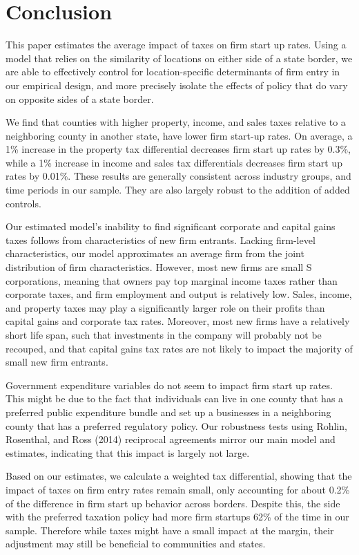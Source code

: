 \documentclass[12pt,a4paper]{article}
\begin{document}
\section{Conclusion}

This paper estimates the average impact of taxes on firm start up rates. Using a model that relies on the similarity of locations on either side of a state border, we are able to effectively control for location-specific determinants of firm entry in our empirical design, and more precisely isolate the effects of policy  that do vary on opposite sides of a state border. 

We find that counties with higher property, income, and sales taxes relative to a neighboring county in another state, have lower firm start-up rates. On average, a 1\% increase in the property tax differential decreases firm start up rates by 0.3\%, while a 1\% increase in income and sales tax differentials decreases firm start up rates by 0.01\%.   These results are generally consistent across industry groups, and time periods in our sample.  They are also largely robust to the addition of added controls.

Our estimated model's inability to find significant corporate and capital gains taxes follows from characteristics of new firm entrants. Lacking firm-level characteristics, our model approximates an average firm from the joint distribution of firm characteristics. However, most new firms are small S corporations, meaning that owners pay top marginal income taxes rather than corporate taxes, and firm employment and output is relatively low. Sales, income, and property taxes may play a significantly larger role on their profits than capital gains and corporate tax rates. Moreover, most new firms have a relatively short life span, such that investments in the company will probably not be recouped, and that capital gains tax rates are not likely to impact the majority of small new firm entrants.

Government expenditure variables do not seem to impact firm start up rates. This might be due to the fact that individuals can live in one county that has a preferred public expenditure bundle and set up a businesses in a neighboring county that has a preferred regulatory policy. Our robustness tests using Rohlin, Rosenthal, and Ross (2014) reciprocal agreements mirror our main model and estimates, indicating that this impact is largely not large.

Based on our estimates, we calculate a weighted tax differential, showing that the impact of taxes on firm entry rates remain small, only accounting for about 0.2\% of the difference in firm start up behavior across borders. Despite this, the side with the preferred taxation policy had more firm startups 62\% of the time in our sample. Therefore while taxes might have a small impact at the margin, their adjustment may still be beneficial to communities and states. 
\end{document}
